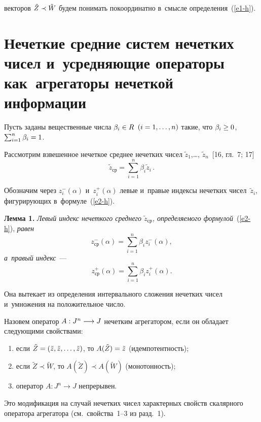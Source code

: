 \begin{multicols}{2}
\pagebreak

\noindent
 векторов 
$\tilde{Z}\hm\prec\tilde{W}$  будем понимать покоординатно в~смысле определения~(\ref{e1-h}).


\section{Нечеткие  средние систем нечетких чисел и~усредняющие операторы 
как~агрегаторы нечеткой информации }


Пусть заданы вещественные чис\-ла
 $\beta_i\hm\in R$ $(i\hm=1,\ldots,n)$ такие, что $\beta_i \hm\geq 0$, 
$\sum\nolimits_{i=1}^n\beta_i\hm = 1$.

Рассмотрим взвешенное нечеткое среднее нечетких чисел   $\tilde{z}_1$,\ldots, 
$\tilde{z}_n$~[16, гл.~7; 17]
\begin{equation}
\tilde{z}_{\mathrm{ср}} = \sum\limits_{i=1}^n\beta_i\tilde{z}_i\,.
\label{e2-h}
\end{equation}


Обозначим через  $z_i^{-}(\alpha)$ и~$z_i^{+}(\alpha)$ левые и~правые индексы 
нечетких чисел~$\tilde{z}_i$, фигурирующих в~формуле~(\ref{e2-h}).

\smallskip

\noindent
\textbf{Лемма 1.} \textit{Левый индекс нечеткого среднего 
$\tilde{z}_{\mathrm{ср}}$, определяемого формулой}~(\ref{e2-h}), 
\textit{равен} 
$$
z^{-}_{\mathrm{ср}}(\alpha)= \sum\limits_{i=1}^n\beta_iz_i^{-}(\alpha),
$$
\textit{а~правый  индекс}~--- 
$$
z^{+}_{\mathrm{ср}}(\alpha)=  \sum\limits_{i=1}^n\beta_iz_i^{+}(\alpha).
$$


\smallskip

Она вытекает  из определения интервального сложения нечетких чисел и~умножения 
на положительное число.

Назовем оператор $A:J^n\hm\longrightarrow J$ нечетким агрегатором, если он обладает 
следующими свойствами:
\begin{enumerate}[(1)]
\item  если $\tilde{Z}\hm=(\tilde{z}, \tilde{z},\ldots, \tilde{z})$, то 
$A(\tilde{Z})\hm=\tilde{z}$ (идемпотентность);
\item
если $\tilde{Z}\prec\tilde{W}$, то $A(\tilde{Z})\prec A(\tilde{W})$ 
(монотонность);
\item
оператор $A:J^n\longrightarrow J$ непрерывен.
\end{enumerate}
Это модификация на случай нечетких чисел характерных свойств скалярного 
оператора агрегатора (см.\ свойства~1--3 из разд.~1).


\end{multicols}
